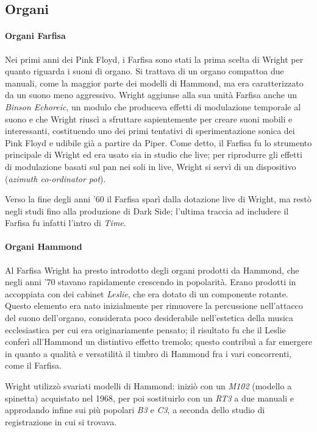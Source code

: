 \documentclass[class=book, crop=false, oneside, 12pt]{standalone}
\begin{document}
    \subsection{Organi}
    \paragraph{Organi Farfisa}
    Nei primi anni dei Pink Floyd, i Farfisa sono stati la prima scelta di Wright per quanto riguarda i suoni di organo. Si trattava di un organo compattoa due manuali, come la maggior parte dei modelli di Hammond, ma era caratterizzato da un suono meno aggressivo. Wright aggiunse alla sua unità Farfisa anche un \emph{Binson Echoreic}, un modulo che produceva effetti di modulazione temporale al suono e che Wright riuscì a sfruttare sapientemente per creare suoni mobili e interessanti, costituendo uno dei primi tentativi di sperimentazione sonica dei Pink Floyd e udibile già a partire da Piper. Come detto, il Farfisa fu lo strumento principale di Wright ed era usato sia in studio che live; per riprodurre gli effetti di modulazione basati sul pan nei soli in live, Wright si servì di un dispositivo (\emph{azimuth co-ordinator pot}).

    Verso la fine degli anni '60 il Farfisa sparì dalla dotazione live di Wright, ma restò negli studi fino alla produzione di Dark Side; l'ultima traccia ad includere il Farfisa fu infatti l'intro di \emph{Time}.

    \paragraph{Organi Hammond}
    Al Farfisa Wright ha presto introdotto degli organi prodotti da Hammond, che negli anni '70 stavano rapidamente crescendo in popolarità. Erano prodotti in accoppiata con dei cabinet \emph{Leslie}, che era dotato di un componente rotante. Questo elemento era nato inizialmente per rimuovere la percussione nell'attacco del suono dell'organo, considerata poco desiderabile nell'estetica della musica ecclesiastica per cui era originariamente pensato; il risultato fu che il Leslie conferì all'Hammond un distintivo effetto tremolo; questo contribuì a far emergere in quanto a qualità e versatilità il timbro di Hammond fra i vari concorrenti, come il Farfisa.

    Wright utilizzò svariati modelli di Hammond: iniziò con un \emph{M102} (modello a spinetta) acquistato nel 1968, per poi sostituirlo con un \emph{RT3} a due manuali e approdando infine sui più popolari \emph{B3} e \emph{C3}, a seconda dello studio di registrazione in cui si trovava.
    
\end{document}
